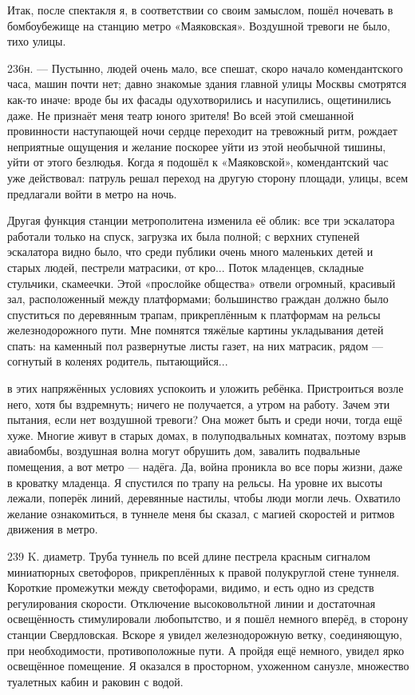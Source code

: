 Итак, после спектакля я, в соответствии со своим замыслом, пошёл ночевать в бомбоубежище на станцию метро «Маяковская». Воздушной тревоги не было, тихо улицы.

\label{236-1}
236н. — Пустынно, людей очень мало, все спешат, скоро начало комендантского часа, машин почти нет; давно знакомые здания главной улицы Москвы смотрятся как-то иначе: вроде бы их фасады одухотворились и насупились, ощетинились даже. Не признаёт меня театр юного зрителя! Во всей этой смешанной провинности наступающей ночи сердце переходит на тревожный ритм, рождает неприятные ощущения и желание поскорее уйти из этой необычной тишины, уйти от этого безлюдья. Когда я подошёл к «Маяковской», комендантский час уже действовал: патруль решал переход на другую сторону площади, улицы, всем предлагали войти в метро на ночь.

\label{237-1}
Другая функция станции метрополитена изменила её облик: все три эскалатора работали только на спуск, загрузка их была полной; с верхних ступеней эскалатора видно было, что среди публики очень много маленьких детей и старых людей, пестрели матрасики, от кро...
Поток младенцев, складные стульчики, скамеечки. Этой «прослойке общества» отвели огромный, красивый зал, расположенный между платформами; большинство граждан должно было спуститься по деревянным трапам, прикреплённым к платформам на рельсы железнодорожного пути. Мне помнятся тяжёлые картины укладывания детей спать: на каменный пол развернутые листы газет, на них матрасик, рядом — согнутый в коленях родитель, пытающийся...

\label{238-1}
в этих напряжённых условиях успокоить и уложить ребёнка. Пристроиться возле него, хотя бы вздремнуть; ничего не получается, а утром на работу. Зачем эти пытания, если нет воздушной тревоги? Она может быть и среди ночи, тогда ещё хуже. Многие живут в старых домах, в полуподвальных комнатах, поэтому взрыв авиабомбы, воздушная волна могут обрушить дом, завалить подвальные помещения, а вот метро — надёга. Да, война проникла во все поры жизни, даже в кроватку младенца. Я спустился по трапу на рельсы. На уровне их высоты лежали, поперёк линий, деревянные настилы, чтобы люди могли лечь. Охватило желание ознакомиться, в туннеле меня бы сказал, с магией скоростей и ритмов движения в метро.

\label{239-1}
239 K. диаметр. Труба туннель по всей длине пестрела красным сигналом миниатюрных светофоров, прикреплённых к правой полукруглой стене туннеля. Короткие промежутки между светофорами, видимо, и есть одно из средств регулирования скорости. Отключение высоковольтной линии и достаточная освещённость стимулировали любопытство, и я пошёл немного вперёд, в сторону станции Свердловская. Вскоре я увидел железнодорожную ветку, соединяющую, при необходимости, противоположные пути. А пройдя ещё немного, увидел ярко освещённое помещение. Я оказался в просторном, ухоженном санузле, множество туалетных кабин и раковин с водой.


